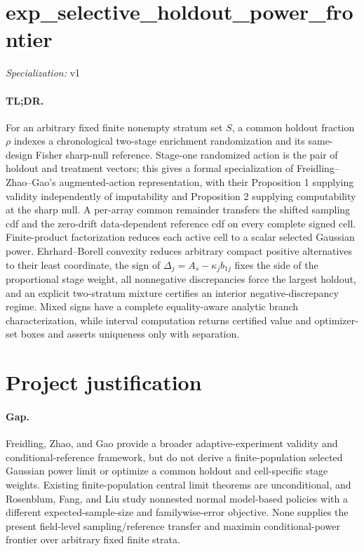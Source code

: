\documentclass{article}
\begin{document}
\sloppy

\section*{exp\_\allowbreak{}selective\_\allowbreak{}holdout\_\allowbreak{}power\_\allowbreak{}frontier}

\noindent\textit{Specialization:} v1\par

\paragraph{TL;DR.} For an arbitrary fixed finite nonempty stratum set \(S\), a common holdout fraction \(\rho\) indexes a chronological two-stage enrichment randomization and its same-design Fisher sharp-null reference. Stage-one randomized action is the pair of holdout and treatment vectors; this gives a formal specialization of Freidling--Zhao--Gao's augmented-action representation, with their Proposition 1 supplying validity independently of imputability and Proposition 2 supplying computability at the sharp null. A per-array common remainder transfers the shifted sampling cdf and the zero-drift data-dependent reference cdf on every complete signed cell. Finite-product factorization reduces each active cell to a scalar selected Gaussian power. Ehrhard--Borell convexity reduces arbitrary compact positive alternatives to their least coordinate, the sign of \(\Delta_j=A_s-\kappa_jb_{1j}\) fixes the side of the proportional stage weight, all nonnegative discrepancies force the largest holdout, and an explicit two-stratum mixture certifies an interior negative-discrepancy regime. Mixed signs have a complete equality-aware analytic branch characterization, while interval computation returns certified value and optimizer-set boxes and asserts uniqueness only with separation.

\section{Project justification}

\paragraph{Gap.} Freidling, Zhao, and Gao provide a broader adaptive-experiment validity and conditional-reference framework, but do not derive a finite-population selected Gaussian power limit or optimize a common holdout and cell-specific stage weights. Existing finite-population central limit theorems are unconditional, and Rosenblum, Fang, and Liu study nonnested normal model-based policies with a different expected-sample-size and familywise-error objective. None supplies the present field-level sampling/reference transfer and maximin conditional-power frontier over arbitrary fixed finite strata.
\end{document}
